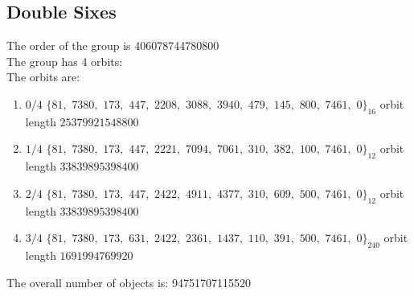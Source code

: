 \documentclass{article}
\begin{document}
{\subsection*{Double Sixes}
The order of the group is 406078744780800\\
\bigskip
The group has 4 orbits: \\
The orbits are:
\begin{enumerate}[(1)]
\item
$0 / 4$ 
$
\{ 81,$ $7380,$ $173,$ $447,$ $2208,$ $3088,$ $3940,$ $479,$ $145,$ $800,$ $7461,$ $0 \}_{16}$ orbit length $25379921548800$\\
\item
$1 / 4$ 
$
\{ 81,$ $7380,$ $173,$ $447,$ $2221,$ $7094,$ $7061,$ $310,$ $382,$ $100,$ $7461,$ $0 \}_{12}$ orbit length $33839895398400$\\
\item
$2 / 4$ 
$
\{ 81,$ $7380,$ $173,$ $447,$ $2422,$ $4911,$ $4377,$ $310,$ $609,$ $500,$ $7461,$ $0 \}_{12}$ orbit length $33839895398400$\\
\item
$3 / 4$ 
$
\{ 81,$ $7380,$ $173,$ $631,$ $2422,$ $2361,$ $1437,$ $110,$ $391,$ $500,$ $7461,$ $0 \}_{240}$ orbit length $1691994769920$\\
\end{enumerate}
The overall number of objects is: 94751707115520\\


%


%


}%
\end{document}
